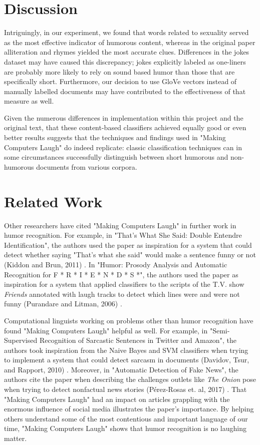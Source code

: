 \documentclass[11pt,a4paper]{article}
\begin{document}
\section{Discussion}
Intriguingly, in our experiment, we found that words related to sexuality served as the most effective indicator of humorous content, whereas in the original paper alliteration and rhymes yielded the most accurate clues. Differences in the jokes dataset may have caused this discrepancy; jokes explicitly labeled as one-liners are probably more likely to rely on sound based humor than those that are specifically short. Furthermore, our decision to use GloVe vectors instead of manually labelled documents may have contributed to the effectiveness of that measure as well.

Given the numerous differences in implementation within this project and the original text, that these content-based classifiers achieved equally good or even better results suggests that the techniques and findings used in "Making Computers Laugh" do indeed replicate: classic classification techniques can in some circumstances successfully distinguish between short humorous and non-humorous documents from various corpora.

\section{Related Work}

Other researchers have cited "Making Computers Laugh" in further work in humor recognition. For example, in "That's What She Said: Double Entendre Identification", the authors used the paper as inspiration for a system that could detect whether saying "That's what she said" would make a sentence funny or not (Kiddon and Brun, 2011) \cite{kiddon2011s}. In "Humor: Prosody Analysis and Automatic Recognition for F * R * I * E * N * D * S *", the authors used the paper as inspiration for a system that applied classifiers to the scripts of the T.V. show \emph{Friends} annotated with laugh tracks to detect which lines were and were not funny (Purandare and Litman, 2006) \cite{purandare2006humor}.

Computational linguists working on problems other than humor recognition have found "Making Computers Laugh" helpful as well. For example, in "Semi-Supervised Recognition of Sarcastic Sentences in Twitter and Amazon", the authors took inspiration from the Naive Bayes and SVM classifiers when trying to implement a system that could detect sarcasm in documents (Davidov, Tsur, and Rapport, 2010) \cite{davidov2010semi}. Moreover, in "Automatic Detection of Fake News", the authors cite the paper when describing the challenges outlets like \emph{The Onion} pose when trying to detect nonfactual news stories (P{\'e}rez-Rosas et. al, 2017) \cite{perez2017automatic}. That "Making Computers Laugh" had an impact on articles grappling with the enormous influence of social media illustrates the paper's importance. By helping others understand some of the most contentious and important language of our time, "Making Computers Laugh" shows that humor recognition is no laughing matter.



\end{document}
